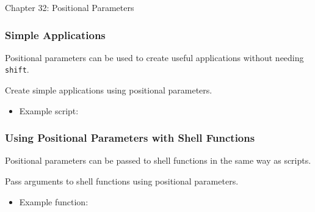 \begin{notes}{Chapter 32: Positional Parameters}
\begin{highlight}
    \end{highlight}
    
    \subsubsection*{Simple Applications}
    
    Positional parameters can be used to create useful applications without needing \texttt{shift}.
    
    \begin{highlight}
    
    Create simple applications using positional parameters.
    
    \begin{itemize}
        \item Example script:
    \end{itemize}
    
    \end{highlight}
    
    \subsubsection*{Using Positional Parameters with Shell Functions}
    
    Positional parameters can be passed to shell functions in the same way as scripts.
    
    \begin{highlight}
    
    Pass arguments to shell functions using positional parameters.
    
    \begin{itemize}
        \item Example function:
    \end{itemize}
    

\end{highlight}
\end{notes}
